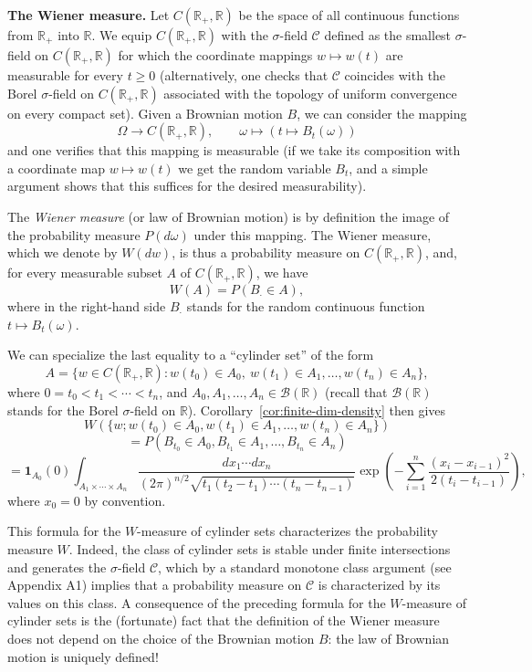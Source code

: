 \documentclass[../Main.tex]{subfiles}
\begin{document}
\textbf{The Wiener measure.} Let $C(\mathbb R_+,\mathbb R)$ be the space of all continuous functions from $\mathbb R_+$ into $\mathbb R$. We equip $C(\mathbb R_+,\mathbb R)$ with the $\sigma$-field $\mathcal C$ defined as the smallest $\sigma$-field on $C(\mathbb R_+,\mathbb R)$ for which the coordinate mappings $w\mapsto w(t)$ are measurable for every $t\geq 0$ (alternatively, one checks that $\mathcal C$ coincides with the Borel $\sigma$-field on $C(\mathbb R_+,\mathbb R)$ associated with the topology of uniform convergence on every compact set). Given a Brownian motion $B$, we can consider the mapping
\[
\Omega \longrightarrow C(\mathbb R_+,\mathbb R), \qquad \omega \mapsto (t\mapsto B_t(\omega))
\]
and one verifies that this mapping is measurable (if we take its composition with a coordinate map $w\mapsto w(t)$ we get the random variable $B_t$, and a simple argument shows that this suffices for the desired measurability).
 
The \emph{Wiener measure} (or law of Brownian motion) is by definition the image of the probability measure $P(d\omega)$ under this mapping. The Wiener measure, which we denote by $W(dw)$, is thus a probability measure on $C(\mathbb R_+,\mathbb R)$, and, for every measurable subset $A$ of $C(\mathbb R_+,\mathbb R)$, we have
\[
W(A) = P(B_\cdot \in A),
\]
where in the right-hand side $B_\cdot$ stands for the random continuous function $t\mapsto B_t(\omega)$.
 
We can specialize the last equality to a ``cylinder set'' of the form
\[
A = \{w\in C(\mathbb R_+,\mathbb R) : w(t_0)\in A_0,\ w(t_1)\in A_1,\dots,w(t_n)\in A_n\},
\]
where $0=t_0<t_1<\cdots<t_n$, and $A_0,A_1,\dots,A_n\in\mathcal B(\mathbb R)$ (recall that $\mathcal B(\mathbb R)$ stands for the Borel $\sigma$-field on $\mathbb R$). Corollary~\ref{cor:finite-dim-density} then gives
\[
W(\{w; w(t_0)\in A_0, w(t_1)\in A_1,\dots,w(t_n)\in A_n\})
\]
\[
= P(B_{t_0}\in A_0, B_{t_1}\in A_1,\dots,B_{t_n}\in A_n)
\]
\[
= \mathbf 1_{A_0}(0)\int_{A_1\times\cdots\times A_n} \frac{dx_1\cdots dx_n}{(2\pi)^{n/2}\sqrt{t_1(t_2-t_1)\cdots(t_n-t_{n-1})}}\exp\left(-\sum_{i=1}^n \frac{(x_i-x_{i-1})^2}{2(t_i-t_{i-1})}\right),
\]
where $x_0=0$ by convention.
 
This formula for the $W$-measure of cylinder sets characterizes the probability measure $W$. Indeed, the class of cylinder sets is stable under finite intersections and generates the $\sigma$-field $\mathcal C$, which by a standard monotone class argument (see Appendix A1) implies that a probability measure on $\mathcal C$ is characterized by its values on this class. A consequence of the preceding formula for the $W$-measure of cylinder sets is the (fortunate) fact that the definition of the Wiener measure does not depend on the choice of the Brownian motion $B$: the law of Brownian motion is uniquely defined!
 
\end{document}
